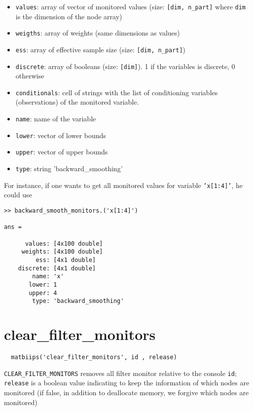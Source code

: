 \documentclass[11pt,twoside]{article}
\begin{document}
  \begin{itemize}
   \item \texttt{values}: array of vector of monitored values (size: \texttt{[dim, n\_part]} where \texttt{dim} is the dimension of the node array)
   \item \texttt{weigths}: array of weights (same dimensions as values)
   \item \texttt{ess}: array of effective  sample size (size: \texttt{[dim, n\_part]})
   \item \texttt{discrete}: array of booleans (size: \texttt{[dim]}). 1 if the variables is discrete, 0 otherwise
   \item \texttt{conditionals}: cell of strings with the list of conditioning variables (observations) of the monitored variable.
   \item \texttt{name}: name of the variable
   \item \texttt{lower}: vector of lower bounds
   \item \texttt{upper}: vector of upper bounds
   \item \texttt{type}: string 'backward\_smoothing'
   \end{itemize}

  For instance, if one wants to get all monitored values for variable \texttt{'x[1:4]'}, he could use
 \begin{lstlisting}
>> backward_smooth_monitors.('x[1:4]')

ans =

      values: [4x100 double]
     weights: [4x100 double]
         ess: [4x1 double]
    discrete: [4x1 double]
        name: 'x'
       lower: 1
       upper: 4
        type: 'backward_smoothing'

 \end{lstlisting}

\section{clear\_filter\_monitors}

 \begin{lstlisting}
  matbiips('clear_filter_monitors', id , release)
 \end{lstlisting}

  \texttt{CLEAR\_FILTER\_MONITORS} removes all filter monitor relative to the console \texttt{id};
  \texttt{release} is a  boolean value indicating to keep the information of which nodes are monitored (if false, in addition to deallocate memory,
  we forgive which nodes are monitored)
\end{document}
